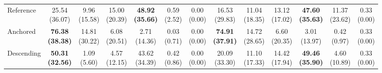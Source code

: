 {\begin{tabular}{l|cccccc|cccccc}
Reference & \makecell{25.54 \\ (36.07)} & \makecell{9.96 \\ (15.58)} & \makecell{15.00 \\ (20.39)} & {\cellcolor[HTML]{C8E6C9}} \bfseries \makecell{48.92 \\ (35.66)} & \makecell{0.59 \\ (2.52)} & \makecell{0.00 \\ (0.00)} & \makecell{16.53 \\ (29.83)} & \makecell{11.04 \\ (18.35)} & \makecell{13.12 \\ (17.02)} & {\cellcolor[HTML]{C8E6C9}} \bfseries \makecell{47.60 \\ (35.63)} & \makecell{11.37 \\ (23.62)} & \makecell{0.33 \\ (0.00)} \\
Anchored & \bfseries \makecell{76.38 \\ (38.38)} & \makecell{14.81 \\ (30.22)} & \makecell{6.08 \\ (20.51)} & {\cellcolor[HTML]{C8E6C9}} \makecell{2.71 \\ (14.36)} & \makecell{0.03 \\ (0.71)} & \makecell{0.00 \\ (0.00)} & \bfseries \makecell{74.91 \\ (37.91)} & \makecell{14.72 \\ (28.65)} & \makecell{6.60 \\ (20.35)} & {\cellcolor[HTML]{C8E6C9}} \makecell{3.01 \\ (13.97)} & \makecell{0.42 \\ (0.97)} & \makecell{0.33 \\ (0.00)} \\
Descending & \bfseries \makecell{50.31 \\ (32.56)} & \makecell{1.09 \\ (5.60)} & \makecell{4.57 \\ (12.15)} & {\cellcolor[HTML]{C8E6C9}} \makecell{43.62 \\ (34.39)} & \makecell{0.42 \\ (0.86)} & \makecell{0.00 \\ (0.00)} & \makecell{20.09 \\ (33.30)} & \makecell{11.10 \\ (17.33)} & \makecell{14.42 \\ (17.94)} & {\cellcolor[HTML]{C8E6C9}} \bfseries \makecell{49.46 \\ (35.90)} & \makecell{4.60 \\ (10.89)} & \makecell{0.33 \\ (0.00)} \\
\bottomrule
\end{tabular}
}%
